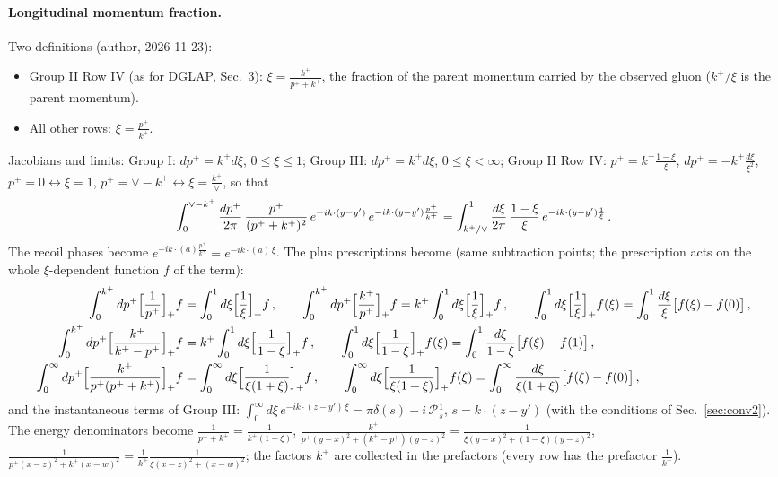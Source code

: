 \documentclass[9pt]{article}
\numberwithin{equation}{section}
\begin{document}
\paragraph*{Longitudinal momentum fraction.} Two definitions (author, 2026-11-23):
\begin{itemize}
\item Group II Row IV (as for DGLAP, Sec.~3): $\xi=\frac{k^{+}}{p^{+}+k^{+}}$, the fraction of the parent momentum carried by the observed gluon ($k^{+}/\xi$ is the parent momentum).
\item All other rows: $\xi=\frac{p^{+}}{k^{+}}$.
\end{itemize}
Jacobians and limits: Group I: $dp^{+}=k^{+}d\xi$, $0\le\xi\le1$; Group III: $dp^{+}=k^{+}d\xi$, $0\le\xi<\infty$; Group II Row IV: $p^{+}=k^{+}\frac{1-\xi}{\xi}$, $dp^{+}=-k^{+}\frac{d\xi}{\xi^{2}}$, $p^{+}=0\leftrightarrow\xi=1$, $p^{+}=\vee-k^{+}\leftrightarrow\xi=\frac{k^{+}}{\vee}$, so that
\begin{align}
\int_{0}^{\vee-k^{+}}\frac{dp^{+}}{2\pi}\,\frac{p^{+}}{(p^{+}+k^{+})^{2}}\,e^{-ik\cdot(y-y')}\,e^{-ik\cdot(y-y')\frac{p^{+}}{k^{+}}}=\int_{k^{+}/\vee}^{1}\frac{d\xi}{2\pi}\,\frac{1-\xi}{\xi}\,e^{-ik\cdot(y-y')\frac{1}{\xi}}\,.\notag
\end{align}
The recoil phases become $e^{-ik\cdot(a)\frac{p^{+}}{k^{+}}}=e^{-ik\cdot(a)\,\xi}$. The plus prescriptions become (same subtraction points; the prescription acts on the whole $\xi$-dependent function $f$ of the term):
\begin{align}
\int_{0}^{k^{+}}dp^{+}\Big[\frac{1}{p^{+}}\Big]_{+}f&=\int_{0}^{1}d\xi\Big[\frac{1}{\xi}\Big]_{+}f\,,\qquad \int_{0}^{k^{+}}dp^{+}\Big[\frac{k^{+}}{p^{+}}\Big]_{+}f=k^{+}\int_{0}^{1}d\xi\Big[\frac{1}{\xi}\Big]_{+}f\,,\qquad \int_{0}^{1}d\xi\Big[\frac{1}{\xi}\Big]_{+}f(\xi)=\int_{0}^{1}\frac{d\xi}{\xi}\big[f(\xi)-f(0)\big]\,,\notag\\
\int_{0}^{k^{+}}dp^{+}\Big[\frac{k^{+}}{k^{+}-p^{+}}\Big]_{+}f&=k^{+}\int_{0}^{1}d\xi\Big[\frac{1}{1-\xi}\Big]_{+}f\,,\qquad \int_{0}^{1}d\xi\Big[\frac{1}{1-\xi}\Big]_{+}f(\xi)=\int_{0}^{1}\frac{d\xi}{1-\xi}\big[f(\xi)-f(1)\big]\,,\notag\\
\int_{0}^{\infty}dp^{+}\Big[\frac{k^{+}}{p^{+}(p^{+}+k^{+})}\Big]_{+}f&=\int_{0}^{\infty}d\xi\Big[\frac{1}{\xi(1+\xi)}\Big]_{+}f\,,\qquad \int_{0}^{\infty}d\xi\Big[\frac{1}{\xi(1+\xi)}\Big]_{+}f(\xi)=\int_{0}^{\infty}\frac{d\xi}{\xi(1+\xi)}\big[f(\xi)-f(0)\big]\,,\notag
\end{align}
and the instantaneous terms of Group III: $\int_{0}^{\infty}d\xi\,e^{-ik\cdot(z-y')\,\xi}=\pi\delta(s)-i\,\mathcal{P}\frac{1}{s}$, $s=k\cdot(z-y')$ (with the conditions of Sec.~\ref{sec:conv2}). The energy denominators become $\frac{1}{p^{+}+k^{+}}=\frac{1}{k^{+}(1+\xi)}$, $\frac{k^{+}}{p^{+}(y-x)^{2}+(k^{+}-p^{+})(y-z)^{2}}=\frac{1}{\xi(y-x)^{2}+(1-\xi)(y-z)^{2}}$, $\frac{1}{p^{+}(x-z)^{2}+k^{+}(x-w)^{2}}=\frac{1}{k^{+}}\frac{1}{\xi(x-z)^{2}+(x-w)^{2}}$; the factors $k^{+}$ are collected in the prefactors (every row has the prefactor $\frac{1}{k^{+}}$).
\end{document}
